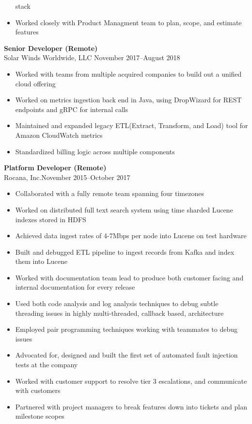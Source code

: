 \documentclass[margin]{res}
\begin{document}
\begin{resume}
\begin{itemize}
            stack
        \item Worked closely with Product Managment team to plan, scope, and
            estimate features
    \end{itemize}
{\bf Senior Developer (Remote)} \\
    Solar Winds Worldwide, LLC \hfill November 2017--August 2018
    \begin{itemize}
        \item Worked with teams from multiple acquired companies to build out
            a unified cloud offering
        \item Worked on metrics ingestion back end in Java, using DropWizard
            for REST endpoints and gRPC for internal calls
        \item Maintained and expanded legacy ETL(Extract, Transform, and Load)
            tool for Amazon CloudWatch metrics
        \item Standardized billing logic across multiple components
    \end{itemize}
{\bf Platform Developer (Remote)}\\
    Rocana, Inc.\hfill November 2015--October 2017
\begin{itemize}
    \item Collaborated with a fully remote team spanning four timezones
    \item Worked on distributed full text search system using time sharded
        Lucene indexes stored in HDFS
    \item Achieved data ingest rates of 4-7Mbps per node into Lucene on test
        hardware
    \item Built and debugged ETL pipeline to ingest records from Kafka
        and index them into Lucene
    \item Worked with documentation team lead to produce both customer facing
        and internal documentation for every release
    \item Used both code analysis and log analysis techniques to debug subtle
        threading issues in highly multi-threaded, callback based, architecture
    \item Employed pair programming techniques working with teammates to debug
        issues
    \item Advocated for, designed and built the first set of automated fault
        injection tests at the company
    \item Worked with customer support to resolve tier 3 escalations, and
        communicate with customers
    \item Partnered with project managers to break features down into tickets
        and plan milestone scopes
\end{itemize}


\end{resume}
\end{document}
